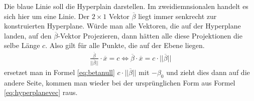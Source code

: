 \documentclass[
]{article}
\begin{document}
Die blaue Linie soll die Hyperplain darstellen. Im zweidiemnsionalen
handelt es sich hier um eine Linie. Der \(2 \times 1\) Vektor
\(\overline{\beta}\) liegt immer senkrecht zur konstruierten Hyperplane.
Würde man alle Vektoren, die auf der Hyperplane landen, auf den
\(\overline{\beta}\)-Vektor Projezieren, dann hätten alle diese
Projektionen die selbe Länge \(c\). Also gilt für alle Punkte, die auf
der Ebene liegen. \begin{align}
\frac{\overline \beta}{||\overline{\beta}||}\cdot \overline{x}=c \Leftrightarrow \overline{\beta}\cdot \overline{x}=c \cdot ||\overline{\beta}||\label{eq:betanull}
\end{align} ersetzet man in Formel \ref{eq:betanull}
\(c \cdot ||\overline{\beta}||\) mit \(-\beta_0\) und zieht dies dann
auf die andere Seite, kommen man wieder bei der ursprünglichen Form aus
Formel \ref{eq:hyperplanevec} raus.
\end{document}
